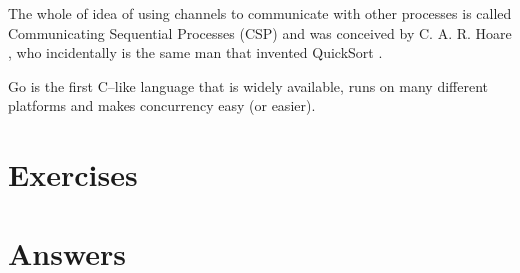 The whole of idea of using channels to communicate with other processes
is called Communicating Sequential Processes (CSP) and was conceived
by C. A. R. Hoare \cite{hoare}, who incidentally is the same man that
invented QuickSort \cite{Quicksort}.

\begin{lbar}
Go is the first C--like language that is widely available,
runs on many
different platforms and makes concurrency easy (or easier).
\end{lbar}

\section{Exercises}


\cleardoublepage
\section{Answers}
\shipoutAnswer
